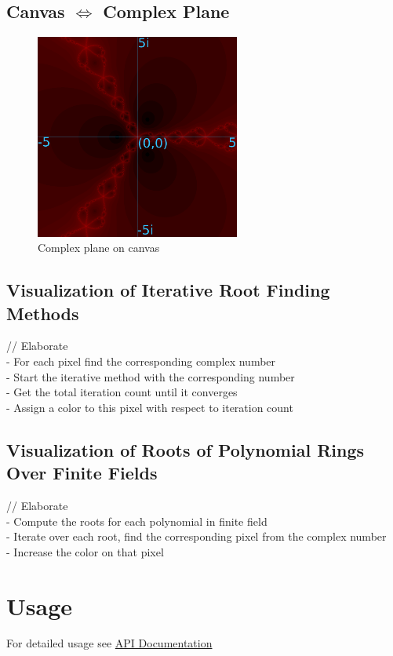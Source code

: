 \subsection{Canvas $\iff$ Complex Plane}

\begin{figure}[!htbp]
    \centering
    \includegraphics[width=0.6\textwidth]{Imgs/fig4.png}
    \caption{Complex plane on canvas}
    \label{fig:canvas-complex-plane}
\end{figure}

\subsection{Visualization of Iterative Root Finding Methods}

// Elaborate\\
-   For each pixel find the corresponding complex number\\
-   Start the iterative method with the corresponding number\\
-   Get the total iteration count until it converges\\
-   Assign a color to this pixel with respect to iteration count\\

\subsection{Visualization of Roots of Polynomial Rings Over Finite Fields}

// Elaborate\\
-   Compute the roots for each polynomial in finite field \\
-   Iterate over each root, find the corresponding pixel from the complex number\\
-   Increase the color on that pixel\\

\section{Usage}

For detailed usage see \hyperref[Appendix 1]{API Documentation}
